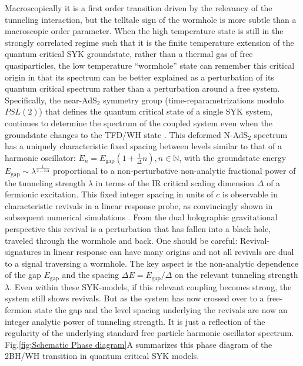 Macroscopically it is a first order transition driven by the relevancy of the tunneling interaction, but the telltale sign of the wormhole is more subtle than a macroscopic order parameter. When the high temperature state is still in the strongly correlated regime such that it is the finite temperature extension of the quantum critical SYK groundstate, rather than a thermal gas of free quasiparticles, the low temperature ``wormhole'' state can remember this critical origin in that its spectrum can be better explained as a perturbation of its quantum critical spectrum rather than a perturbation around a free system. Specifically, the near-AdS$_2$ symmetry group (time-reparametrizations modulo $PSL(2)$) that defines the quantum critical state of a single SYK system, continues to determine the spectrum of the coupled system even when the groundstate changes to the TFD/WH state \cite{maldacena2018eternal}. This deformed N-AdS$_2$ spectrum has a uniquely characteristic fixed spacing between levels similar to that of a harmonic oscillator: $E_n = E_{\text{gap}}(1+ \frac{1}{\Delta}n), n \in \mathbb{N}$, with the groundstate energy $E_{\text{gap}}\sim \lambda^{\frac{1}{2-2\Delta}}$ proportional to a non-perturbative non-analytic fractional power of the tunneling strength $\lambda$ in terms of the IR critical scaling dimension $\Delta$ of a fermionic excitation. This fixed integer spacing in units of $c$ is observable in characteristic revivals in a linear response probe, as convincingly shown in subsequent numerical simulations \cite{maldacenaSYKWormholeFormation2020a,plugge2020revival,sahoo2020traversable,qiCoupledSYKModel2020a} . From the dual holographic gravitational perspective this revival is a perturbation that has fallen into a black hole, traveled through the wormhole and back. One should be careful: Revival-signatures in linear response can have many origins and not all revivals are dual to a signal traversing a wormhole. The key aspect is the non-analytic dependence of the gap $E_{\text{gap}}$ and the spacing $\Delta E =E_{\text{gap}}/\Delta$ on the relevant tunneling strength $\lambda$. Even within these SYK-models, if this relevant coupling becomes strong, the system still shows revivals. But as the system has now crossed over to a free-fermion state the gap and the level spacing underlying the revivals are now an integer analytic power of tunneling strength. It is just a reflection of the regularity of the underlying standard free particle harmonic oscillator spectrum. 
Fig.\ref{fig:Schematic Phase diagram}A summarizes this phase diagram of the 2BH/WH transition in quantum critical SYK models.




